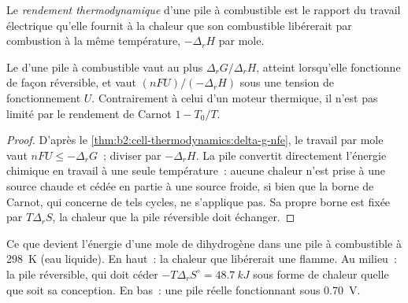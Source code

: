 \begin{definition}\label{def:b2:cell-thermodynamics:efficiency}
Le \emph{rendement thermodynamique} d'une pile à
combustible est le rapport du travail électrique qu'elle fournit à la chaleur que son combustible
libérerait par combustion à la même température, $-\Delta_r H$ par mole.
\end{definition}

\begin{proposition}\label{prop:b2:cell-thermodynamics:efficiency}
Le  d'une pile à combustible vaut au plus $\Delta_r G/\Delta_r H$,
atteint lorsqu'elle fonctionne de façon réversible, et vaut $(nFU)/(-\Delta_r H)$ sous une tension
de fonctionnement $U$. Contrairement à celui d'un moteur thermique, il n'est pas limité par le rendement de Carnot
$1 - T_0/T$.
\end{proposition}

\begin{proof}
D'après le \cref{thm:b2:cell-thermodynamics:delta-g-nfe}, le travail par mole vaut $nFU \leq
-\Delta_r G$~; diviser par $-\Delta_r H$. La pile convertit directement l'énergie chimique
en travail à une seule température~: aucune chaleur n'est prise à une source chaude et
cédée en partie à une source froide, si bien que la borne de Carnot, qui concerne de tels cycles,
ne s'applique pas. Sa propre borne est fixée par $T\Delta_r S$, la chaleur que la pile
réversible doit échanger.
\end{proof}

\begin{omfigure}

{\small Ce que devient l'énergie d'une mole de dihydrogène dans une pile à combustible à
\qty{298}{K} (eau liquide). En haut~: la chaleur que libérerait une flamme. Au milieu~: la
pile réversible, qui doit céder $-T\Delta_r S^\circ = \qty{48.7}{kJ}$ sous forme de chaleur
quelle que soit sa conception. En bas~: une pile réelle fonctionnant sous \qty{0.70}{V}.}
\end{omfigure}

